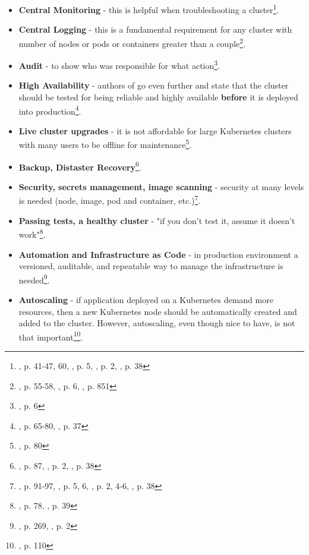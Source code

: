 \begin{itemize}
\item \textbf{Central Monitoring} - this is helpful when troubleshooting a cluster\footnote{\cite{book-mastering-k8s}, p. 41-47, 60, \cite{online-weave-checklists}, p. 5, \cite{online-weave-guide}, p. 2, \cite{book-cndwk}, p. 38}.
\item \textbf{Central Logging} - this is a fundamental requirement for any cluster with number of nodes or pods or containers greater than a couple\footnote{\cite{book-mastering-k8s}, p. 55-58, \cite{online-weave-checklists}, p. 6, \cite{book-devops-k8s}, p. 851}.
\item \textbf{Audit} - to show who was responsible for what action\footnote{\cite{online-weave-guide}, p. 6}.
\item \textbf{High Availability} - authors of \cite{book-mastering-k8s} go even further and state that the cluster should be tested for being reliable and highly available \textbf{before} it is deployed into production\footnote{\cite{book-mastering-k8s}, p. 65-80, \cite{book-cndwk}, p. 37}.
\item \textbf{Live cluster upgrades} - it is not affordable for large Kubernetes clusters with many users to be offline for maintenance\footnote{\cite{book-mastering-k8s}, p. 80}.
\item \textbf{Backup, Distaster Recovery}\footnote{\cite{book-mastering-k8s}, p. 87, \cite{online-weave-guide}, p. 2, \cite{book-cndwk}, p. 38}.
\item \textbf{Security, secrets management, image scanning} - security at many levels is needed (node, image, pod and container, etc.)\footnote{\cite{book-mastering-k8s}, p. 91-97, \cite{online-weave-checklists}, p. 5, 6, \cite{online-weave-guide}, p. 2, 4-6, \cite{book-cndwk}, p. 38}.
\item \textbf{Passing tests, a healthy cluster} - "if you don't test it, assume it doesn't work"\footnote{\cite{book-mastering-k8s}, p. 78, \cite{book-cndwk}, p. 39}.
\item \textbf{Automation and Infrastructure as Code} - in production environment a versioned, auditable, and repeatable way to manage the infrastructure is needed\footnote{\cite{book-mastering-k8s}, p. 269, \cite{online-weave-guide}, p. 2}.
\item \textbf{Autoscaling} - if application deployed on a Kubernetes demand more resources, then a new Kubernetes node should be automatically created and added to the cluster. However, autoscaling, even though nice to have, is not that important\footnote{\cite{book-cndwk}, p. 110}.
\end{itemize}

